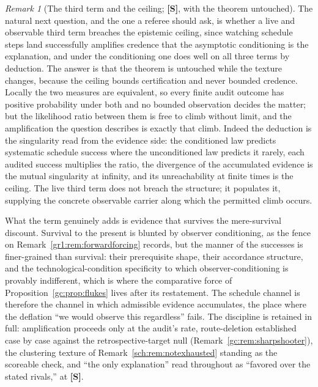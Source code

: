 \documentclass[11pt]{article}
\numberwithin{equation}{section}
\theoremstyle{plain}
\theoremstyle{definition}
\theoremstyle{remark}
\newtheorem{remark}[theorem]{Remark}
\begin{document}
\begin{remark}[The third term and the ceiling; \textbf{[S]}, with the
theorem untouched]\label{sch:rem:thirdceiling}
The natural next question, and the one a referee should ask, is
whether a live and observable third term breaches the epistemic
ceiling, since watching schedule steps land successfully amplifies
credence that the asymptotic conditioning is the explanation, and
under the conditioning one does well on all three terms by deduction.
The answer is that the theorem is untouched while the texture
changes, because the ceiling bounds certification and never bounded
credence. Locally the two measures are equivalent, so every finite
audit outcome has positive probability under both and no bounded
observation decides the matter; but the likelihood ratio between
them is free to climb without limit, and the amplification the
question describes is exactly that climb. Indeed the deduction is
the singularity read from the evidence side: the conditioned law
predicts systematic schedule success where the unconditioned law
predicts it rarely, each audited success multiplies the ratio, the
divergence of the accumulated evidence is the mutual singularity at
infinity, and its unreachability at finite times is the ceiling. The
live third term does not breach the structure; it populates it,
supplying the concrete observable carrier along which the permitted
climb occurs.

What the term genuinely adds is evidence that survives the
mere-survival discount. Survival to the present is blunted by
observer conditioning, as the fence on
Remark~\ref{gr1:rem:forwardforcing} records, but the manner of the
successes is finer-grained than survival: their prerequisite shape,
their accordance structure, and the technological-condition
specificity to which observer-conditioning is provably indifferent,
which is where the comparative force of
Proposition~\ref{gc:prop:flukes} lives after its restatement. The
schedule channel is therefore the channel in which admissible
evidence accumulates, the place where the deflation ``we would
observe this regardless'' fails. The discipline is retained in full:
amplification proceeds only at the audit's rate, route-deletion
established case by case against the retrospective-target null
(Remark~\ref{gc:rem:sharpshooter}), the clustering texture of
Remark~\ref{sch:rem:notexhausted} standing as the scoreable check,
and ``the only explanation'' read throughout as ``favored over the
stated rivals,'' at \textbf{[S]}.


\end{remark}
\end{document}

